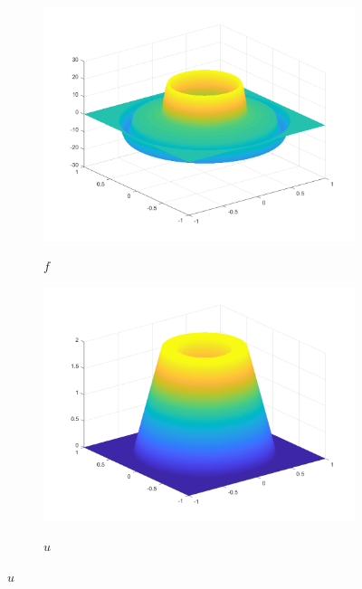 \begin{figure}[!ht]
  \centering
  \begin{subfigure}[b]{.48\linewidth}
    \caption{$f$}
    \includegraphics[trim = 40 30 30 30, clip, width=\linewidth]
      {pictures/chapExperiments/secGeneralInfo/f01Plots/inSi.png}
    \label{fig:f01InSi}
  \end{subfigure}
  \quad
  \begin{subfigure}[b]{.48\linewidth}
    \caption{$u$}
    \includegraphics[trim = 40 30 30 30, clip, width=\linewidth]
      {pictures/chapExperiments/secGeneralInfo/f01Plots/exactSolution.png}
    \label{fig:f01ExactSol}
  \end{subfigure}


\end{figure}

